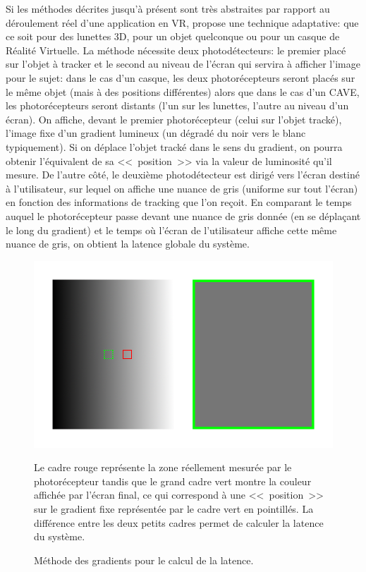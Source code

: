 	\par Si les méthodes décrites jusqu'à présent sont très abstraites par rapport au déroulement réel d'une application en VR, \citep{di_luca_new_2010} propose une technique adaptative: que ce soit pour des lunettes 3D, pour un objet quelconque ou pour un casque de Réalité Virtuelle. La méthode nécessite deux photodétecteurs: le premier placé sur l'objet à tracker et le second au niveau de l'écran qui servira à afficher l'image pour le sujet: dans le cas d'un casque, les deux photorécepteurs seront placés sur le même objet (mais à des positions différentes) alors que dans le cas d'un CAVE, les photorécepteurs seront distants (l'un sur les lunettes, l'autre au niveau d'un écran). On affiche, devant le premier photorécepteur (celui sur l'objet tracké), l'image fixe d'un gradient lumineux (un dégradé du noir vers le blanc typiquement). Si on déplace l'objet tracké dans le sens du gradient, on pourra obtenir l'équivalent de sa <<~position~>> via la valeur de luminosité qu'il mesure. De l'autre côté, le deuxième photodétecteur est dirigé vers l'écran destiné à l'utilisateur, sur lequel on affiche une nuance de gris (uniforme sur tout l'écran) en fonction des informations de tracking que l'on reçoit. En comparant le temps auquel le photorécepteur passe devant une nuance de gris donnée (en se déplaçant le long du gradient) et le temps où l'écran de l'utilisateur affiche cette même nuance de gris, on obtient la latence globale du système.
	
	\begin{figure}[h]
		\centering
		\includegraphics[scale=.5]{Figures/DiLucaGradient}
		\caption{Méthode des gradients pour le calcul de la latence.}{Le cadre rouge représente la zone réellement mesurée par le photorécepteur tandis que le grand cadre vert montre la couleur affichée par l'écran final, ce qui correspond à une <<~position~>> sur le gradient fixe représentée par le cadre vert en pointillés. La différence entre les deux petits cadres permet de calculer la latence du système.}
		\label{fig:di_luca_gradient}
	\end{figure}
	

